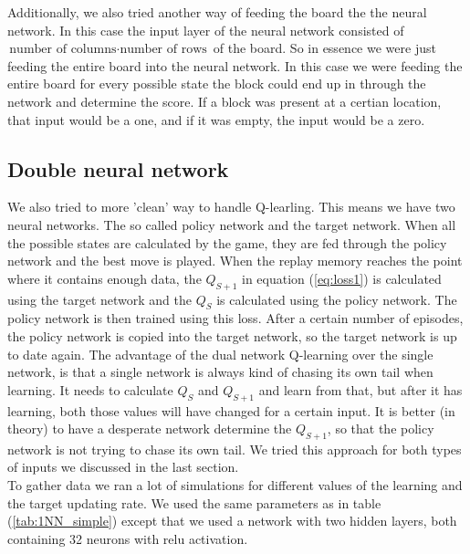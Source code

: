 \documentclass{report}
\begin{document}
Additionally, we also tried another way of feeding the board the the neural network. In this case the input layer of the neural network consisted of $\text{number of columns}\cdot\text{number of rows}$ of the board. So in essence we were just feeding the entire board into the neural network. In this case we were feeding the entire board for every possible state the block could end up in through the network and determine the score. If a block was present at a certian location, that input would be a one, and if it was empty, the input would be a zero.


\subsection{Double neural network}
We also tried to more 'clean' way to handle Q-learling. This means we have two neural networks. The so called policy network and the target network. When all the possible states are calculated by the game, they are fed through the policy network and the best move is played. When the replay memory reaches the point where it contains enough data, the $Q_{S+1}$ in equation (\ref{eq:loss1}) is calculated using the target network and the $Q_S$ is calculated using the policy network. The policy network is then trained using this loss. After a certain number of episodes, the policy network is copied into the target network, so the target network is up to date again. The advantage of the dual network Q-learning over the single network, is that a single network is always kind of chasing its own tail when learning. It needs to calculate $Q_S$ and $Q_{S+1}$ and learn from that, but after it has learning, both those values will have changed for a certain input. It is better (in theory) to have a desperate network determine the $Q_{S+1}$, so that the policy network is not trying to chase its own tail.
We tried this approach for both types of inputs we discussed in the last section.\\
To gather data we ran a lot of simulations for different values of the learning and the target updating rate. We used the same parameters as in table (\ref{tab:1NN_simple}) except that we used a network with two hidden layers, both containing 32 neurons with relu activation.
\end{document}
